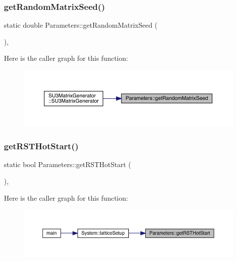 \subsubsection{\texorpdfstring{getRandomMatrixSeed()}{getRandomMatrixSeed()}}
{\footnotesize\ttfamily static double Parameters\+::get\+Random\+Matrix\+Seed (\begin{DoxyParamCaption}{ }\end{DoxyParamCaption})\hspace{0.3cm}{\ttfamily [inline]}, {\ttfamily [static]}}

Here is the caller graph for this function\+:
\nopagebreak
\begin{figure}[H]
\begin{center}
\leavevmode
\includegraphics[width=350pt]{class_parameters_a92d9e73e333b01745747e55d9ae4f7cc_icgraph}
\end{center}
\end{figure}
\mbox{\label{class_parameters_a4c24cb57765589a12eae030894423735}} 
\subsubsection{\texorpdfstring{getRSTHotStart()}{getRSTHotStart()}}
{\footnotesize\ttfamily static bool Parameters\+::get\+R\+S\+T\+Hot\+Start (\begin{DoxyParamCaption}{ }\end{DoxyParamCaption})\hspace{0.3cm}{\ttfamily [inline]}, {\ttfamily [static]}}

Here is the caller graph for this function\+:
\nopagebreak
\begin{figure}[H]
\begin{center}
\leavevmode
\includegraphics[width=350pt]{class_parameters_a4c24cb57765589a12eae030894423735_icgraph}
\end{center}
\end{figure}
\mbox{\label{class_parameters_a3b4e197b2569fb5465e0827430e45eb5}} 
